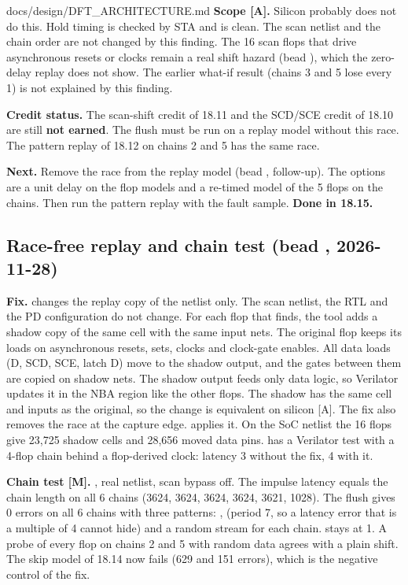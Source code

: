 \begin{relocated}{docs/design/DFT_ARCHITECTURE.md}
\textbf{Scope {[}A{]}.} Silicon probably does not do this. Hold timing is checked
by STA and is clean. The scan netlist and the chain order are not
changed by this finding. The 16 scan flops that drive asynchronous
resets or clocks remain a real shift hazard (bead ),
which the zero-delay replay does not show. The earlier what-if result
(chains 3 and 5 lose every 1) is not explained by this finding.

\textbf{Credit status.} The scan-shift credit of 18.11 and the SCD/SCE
credit of 18.10 are still \textbf{not earned}. The flush must be run on
a replay model without this race. The pattern replay of 18.12 on chains
2 and 5 has the same race.

\textbf{Next.} Remove the race from the replay model (bead
, follow-up). The options are a unit delay on the flop
models and a re-timed model of the 5 flops on the chains. Then run the
pattern replay with the fault sample. \textbf{Done in 18.15.}

\subsection{Race-free replay and chain test (bead ,
2026-11-28)}\label{tm:ch:dft-architecture:1815-race-free-replay}

\textbf{Fix.}  changes the replay copy
of the netlist only. The scan netlist, the RTL and the PD configuration
do not change. For each flop that
 finds, the tool adds a shadow copy
of the same cell with the same input nets. The original flop keeps its
loads on asynchronous resets, sets, clocks and clock-gate enables. All
data loads (D, SCD, SCE, latch D) move to the shadow output, and the
gates between them are copied on shadow nets. The shadow output feeds
only data logic, so Verilator updates it in the NBA region like the
other flops. The shadow has the same cell and inputs as the original,
so the change is equivalent on silicon {[}A{]}. The fix also removes the
race at the capture edge.  applies
it. On the SoC netlist the 16 flops give 23,725 shadow cells and 28,656
moved data pins.  has a Verilator
test with a 4-flop chain behind a flop-derived clock: latency 3 without
the fix, 4 with it.

\textbf{Chain test {[}M{]}.} , real
netlist, scan bypass off. The impulse latency equals the chain length on
all 6 chains (3624, 3624, 3624, 3624, 3621, 1028). The flush gives 0
errors on all 6 chains with three patterns: , 
(period 7, so a latency error that is a multiple of 4 cannot hide) and a
random stream for each chain.  stays at 1. A probe of
every flop on chains 2 and 5 with random data agrees with a plain shift.
The skip model of 18.14 now fails (629 and 151 errors), which is the
negative control of the fix.


\end{relocated}
